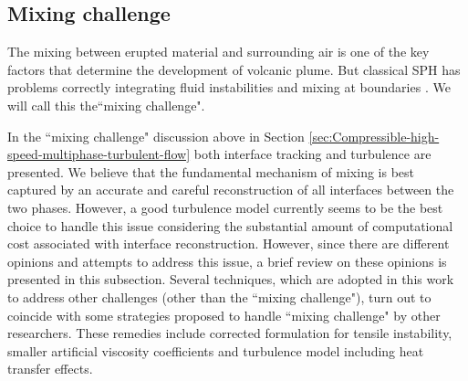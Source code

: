 \subsection{Mixing challenge}

The mixing between erupted material and surrounding air is one of the key factors that determine the development of volcanic plume. 
But classical SPH has problems correctly integrating fluid instabilities and mixing at boundaries \citep{read2010resolving}. We will call this the``mixing challenge".

In the ``mixing challenge" discussion above in Section \ref{sec:Compressible-high-speed-multiphase-turbulent-flow} both interface tracking and turbulence are presented. We believe that the fundamental mechanism of mixing is best captured by  an accurate and careful reconstruction of all interfaces between the two phases. However, a good turbulence model currently seems to be the best choice to handle this issue considering the substantial amount of computational cost associated with interface reconstruction. However, since there are different opinions and attempts to address this issue, a brief review on these opinions is presented in this subsection. Several techniques, which are adopted in this work to address other challenges (other than the ``mixing challenge"), turn out to coincide with some strategies proposed to handle ``mixing challenge" by other researchers. These remedies include corrected formulation for tensile instability, smaller artificial viscosity coefficients and turbulence model including heat transfer effects.

